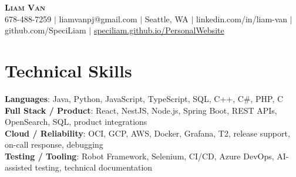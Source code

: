 \documentclass[letterpaper,11pt]{article}
\begin{document}

%
\begin{center}
    \textbf{\Huge \scshape Liam Van} \\ \vspace{1pt}
    \small 678-488-7259 $|$ \small {liamvanpj@gmail.com} $|$ Seattle, WA
 {{$|$ linkedin.com/in/liam-van} {$|$ github.com/SpeciLiam} {$|$ \href{https://speciliam.github.io/PersonalWebsite}{speciliam.github.io/PersonalWebsite}}}

\end{center}

\section{Technical Skills}
 \begin{itemize}[leftmargin=0.15in, label={}]
    \small{\item{
     \textbf{Languages}{: Java, Python, JavaScript, TypeScript, SQL, C++, C\#, PHP, C} \\
     \textbf{Full Stack / Product}{: React, NestJS, Node.js, Spring Boot, REST APIs, OpenSearch, SQL, product integrations} \\
     \textbf{Cloud / Reliability}{: OCI, GCP, AWS, Docker, Grafana, T2, release support, on-call response, debugging} \\
     \textbf{Testing / Tooling}{: Robot Framework, Selenium, CI/CD, Azure DevOps, AI-assisted testing, technical documentation} \\
    }}
 \end{itemize}
%
\end{document}
